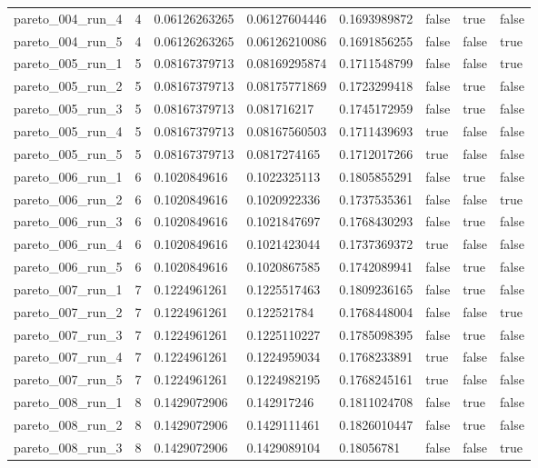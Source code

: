 \begin{tabular}{@{}llllllll@{}}
pareto\_004\_run\_4 & 4 & 0.06126263265 & 0.06127604446 & 0.1693989872 & false & true & false \\
pareto\_004\_run\_5 & 4 & 0.06126263265 & 0.06126210086 & 0.1691856255 & false & false & true \\
pareto\_005\_run\_1 & 5 & 0.08167379713 & 0.08169295874 & 0.1711548799 & false & false & true \\
pareto\_005\_run\_2 & 5 & 0.08167379713 & 0.08175771869 & 0.1723299418 & false & true & false \\
pareto\_005\_run\_3 & 5 & 0.08167379713 & 0.081716217 & 0.1745172959 & false & true & false \\
pareto\_005\_run\_4 & 5 & 0.08167379713 & 0.08167560503 & 0.1711439693 & true & false & false \\
pareto\_005\_run\_5 & 5 & 0.08167379713 & 0.0817274165 & 0.1712017266 & true & false & false \\
pareto\_006\_run\_1 & 6 & 0.1020849616 & 0.1022325113 & 0.1805855291 & false & true & false \\
pareto\_006\_run\_2 & 6 & 0.1020849616 & 0.1020922336 & 0.1737535361 & false & false & true \\
pareto\_006\_run\_3 & 6 & 0.1020849616 & 0.1021847697 & 0.1768430293 & false & true & false \\
pareto\_006\_run\_4 & 6 & 0.1020849616 & 0.1021423044 & 0.1737369372 & true & false & false \\
pareto\_006\_run\_5 & 6 & 0.1020849616 & 0.1020867585 & 0.1742089941 & false & true & false \\
pareto\_007\_run\_1 & 7 & 0.1224961261 & 0.1225517463 & 0.1809236165 & false & true & false \\
pareto\_007\_run\_2 & 7 & 0.1224961261 & 0.122521784 & 0.1768448004 & false & false & true \\
pareto\_007\_run\_3 & 7 & 0.1224961261 & 0.1225110227 & 0.1785098395 & false & true & false \\
pareto\_007\_run\_4 & 7 & 0.1224961261 & 0.1224959034 & 0.1768233891 & true & false & false \\
pareto\_007\_run\_5 & 7 & 0.1224961261 & 0.1224982195 & 0.1768245161 & true & false & false \\
pareto\_008\_run\_1 & 8 & 0.1429072906 & 0.142917246 & 0.1811024708 & false & true & false \\
pareto\_008\_run\_2 & 8 & 0.1429072906 & 0.1429111461 & 0.1826010447 & false & true & false \\
pareto\_008\_run\_3 & 8 & 0.1429072906 & 0.1429089104 & 0.18056781 & false & false & true \\

\end{tabular}
